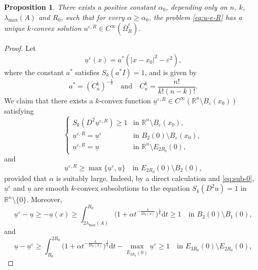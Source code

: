 \documentclass[reqno]{amsart}
\newtheorem{proposition}[theorem]{Proposition}
\theoremstyle{remark}
\theoremstyle{definition}
\numberwithin{equation}{section}
\begin{document}
\begin{proposition}\label{prop:u-e-R-exist}
	There exists a positive constant $\alpha_0$, depending only on $n$, $k$, $\lambda_{\mathrm{max}}(A)$ and $R_0$, such that for every $\alpha\geq\alpha_0$, the problem \eqref{eq:u-e-R} has a unique $k$-convex solution $u^{\varepsilon, R} \in C^{\infty}(\bar{\Omega}_{R}^{\varepsilon})$. 
\end{proposition}
\begin{proof}
	Let
	\begin{equation*}
		\underline{u}^{\varepsilon}(x)=a^*(|x-x_0|^2-\varepsilon^2),
	\end{equation*}
	where the constant $a^*$ satisfies $S_k(a^*I)=1$, and is given by
	$$a^*=(C_n^k)^{-\frac{1}{k}}\quad\text{and}\quad C_n^k=\frac{n!}{k!(n-k)!}.$$ 
	We claim that there exists a $k$-convex function $\underline{u}^{\varepsilon,R}\in C^\infty(\mathbb{R}^n\setminus B_\varepsilon(x_0 ))$ satisfying 
	\begin{equation}\label{eq:subsol}
		\begin{cases}
			S_k(D^2\underline{u}^{\varepsilon,R})\geq 1 & \text{in }\mathbb{R}^n\setminus B_\varepsilon(x_0), \\
			\underline{u}^{\varepsilon,R}=\underline{u}^{\varepsilon} & \text{in }B_2(0)\setminus B_\varepsilon(x_0), \\
			\underline{u}^{\varepsilon,R}=\underline{u} & \text{in }\mathbb{R}^n\setminus E_{2R_0}(0),
		\end{cases}
	\end{equation}
	and
	\begin{equation*}
		\underline{u}^{\varepsilon,R}\geq\max\{\underline{u}^\varepsilon, \underline u\}\quad\text{in }E_{2R_0}(0)\setminus B_2(0),
	\end{equation*}
	provided that $\alpha$ is suitably large. Indeed, by a direct calculation and \eqref{eq:sub-0}, $\underline{u}^{\varepsilon}$ and $\underline{u}$ are smooth $k$-convex subsolutions to the equation $S_k(D^2u)=1$ in $\mathbb{R}^n\setminus \{0\}$. Moreover,
$$\underline{u}^{\varepsilon}-\underline{u}\geq-\underline{u}(x)\geq\int_{2\lambda_{\text{max}}(A)}^{R_0}\bigg(1+\alpha t^{-\frac{k}{2h_k(a)}}\bigg)^\frac{1}{k}\mathrm{d}t\geq1\quad\text{in }B_2(0)\setminus B_1(0),$$
and
$$\underline{u}-\underline{u}^{\varepsilon} \geq \int_{R_0}^{2R_0}\bigg(1+\alpha t^{-\frac{k}{2h_k(a)}}\bigg)^\frac{1}{k}\mathrm{d}t-\max_{\bar{E}_{3R_0}(0)}\underline{u}^{\varepsilon  }\geq1\quad\text{in }E_{3R_0}(0)\setminus E_{2R_0}(0),$$

\end{proof}
\end{document}
